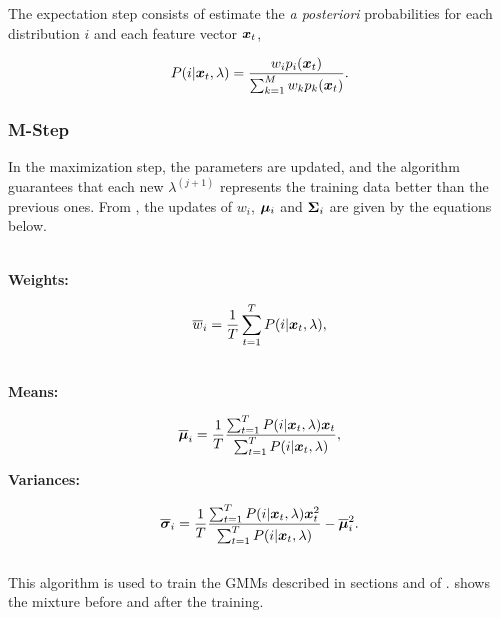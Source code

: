 The expectation step consists of estimate the \emph{a posteriori} probabilities for each distribution $i$ and each feature vector $\boldsymbol{x}_t$,

\begin{equation}
    \postprob{i}{\dvec{x}_t, \lambda} = \frac{w_i p_i(\dvec{x}_t)}{\sum_{k=1}^M w_k p_k(\dvec{x}_t)}.
    \label{eq:e-step-posterior}
\end{equation}

\subsubsection*{M-Step}

In the maximization step, the parameters are updated, and the algorithm guarantees that each new $\lambda^(j+1)$ represents the training data better than the previous ones. From , the updates of $w_i$, $\boldsymbol{\mu}_i$ and $\boldsymbol{\Sigma}_i$ are given by the equations below.

\noindent\\\textbf{Weights:}

\begin{equation}
    \overline{w}_i = \frac{1}{T} \sum_{t=1}^T \postprob{i}{\dvec{x}_t, \lambda},
    \label{eq:m-step-weight}
\end{equation}

\noindent\\\textbf{Means:}

\begin{equation}
    \overline{\dvec{\mu}}_i = \frac{1}{T} \frac{\sum_{t=1}^T \postprob{i}{\dvec{x}_t, \lambda} \dvec{x}_t}{\sum_{t=1}^T \postprob{i}{\dvec{x}_t, \lambda}},
    \label{eq:m-step-means}
\end{equation}

\noindent\textbf{Variances:}

\begin{equation}
    \overline{\dvec{\sigma}}_i = \frac{1}{T} \frac{\sum_{t=1}^T \postprob{i}{\dvec{x}_t, \lambda} \dvec{x}_t^2}{\sum_{t=1}^T \postprob{i}{\dvec{x}_t, \lambda}} - \overline{\dvec{\mu}}_i^2.
    \label{eq:m-step-means}
\end{equation}
\\

This algorithm is used to train the GMMs described in sections  and  of .  shows the mixture before and after the training.

